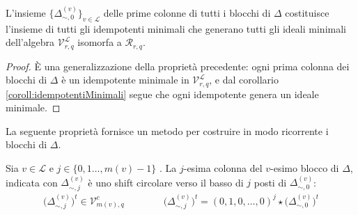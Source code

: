 \begin{prop}
  L'insieme $\lbrace \Delta_{\sim, 0}^{(v)} \rbrace_{v\in \mathscr{L}}$ delle prime colonne di tutti i blocchi di $\Delta$ costituisce l'insieme di tutti gli idempotenti minimali che generano tutti gli ideali minimali dell'algebra 
  $\mathcal{V}_{r, q}^{\mathscr{L}}$ isomorfa a  $\mathcal{R}_{r,q} $.
\end{prop}
\begin{proof}
    È una generalizzazione della proprietà precedente: ogni prima colonna dei blocchi di $\Delta$ è un idempotente minimale in $\mathcal{V}_{r, q}^{\mathscr{L}}$, e dal corollario \ref{coroll:idempotentiMinimali} segue che ogni idempotente genera un ideale minimale.
\end{proof}

La seguente proprietà fornisce un metodo per costruire in modo ricorrente i blocchi di $\Delta$.
\begin{prop}
   Sia $v \in \mathscr{L}$ e $j \in \lbrace 0, 1 \dots , m(v)-1 \rbrace$ . La $j$-esima colonna del $v$-esimo blocco di $\Delta$, indicata con $\Delta_{\sim, j}^{(v)}$ è uno shift circolare verso il basso di $j$ posti di $\Delta_{\sim, 0}^{(v)}$:
   \begin{align*}
      \big( \Delta_{\sim, j}^{(v)} \big)^{t} \in \mathcal{V}_{m(v), q}^{c} 
      \qquad \qquad 
      \big( \Delta_{\sim, j}^{(v)} \big)^{t}  =  (0,1,0,\dots,0)^{j} \star \big( \Delta_{\sim, 0}^{(v)} \big)^{t} 
   \end{align*}
\end{prop}
